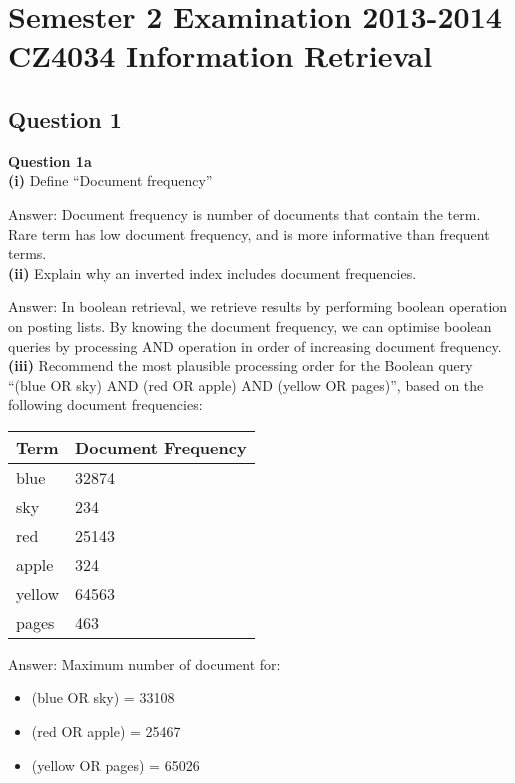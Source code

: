 \documentclass[11pt,a4paper]{report}
\begin{document}
\chapter{Semester 2 Examination 2013-2014\\CZ4034 Information Retrieval}

\begin{multicols*}{2}

\section{Question 1}

\noindent \textbf{Question 1a} \\

\noindent \textbf{(i)} Define ``Document frequency''

\noindent Answer: Document frequency is number of documents that contain the term. Rare term has low document frequency, and is more informative than frequent terms.\\

\noindent \textbf{(ii)} Explain why an inverted index includes document frequencies.

\noindent Answer: In boolean retrieval, we retrieve results by performing boolean operation on posting lists. By knowing the document frequency, we can optimise boolean queries by processing AND operation in order of increasing document frequency.\\

\noindent \textbf{(iii)} Recommend the most plausible processing order for the Boolean query ``(blue OR sky) AND (red OR apple) AND (yellow OR pages)'', based on the following document frequencies:

\begin{center}
\begin{tabular}{ | l | l |} 
    \hline
    Term  & Document Frequency\\
    \hline
    blue  & 32874 \\
    sky   & 234 \\
    red   & 25143 \\
    apple & 324 \\
    yellow& 64563 \\
    pages & 463 \\
    \hline
\end{tabular}
\end{center}

\noindent Answer: Maximum number of document for:
\begin{itemize}
    \item (blue OR sky) = 33108
    \item (red OR apple) = 25467
    \item (yellow OR pages) = 65026
\end{itemize}


\end{multicols*}
\end{document}
